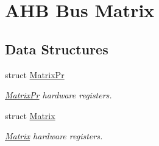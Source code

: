 \hypertarget{group__SAMV71__MATRIX}{}\section{A\+HB Bus Matrix}
\label{group__SAMV71__MATRIX}
\subsection*{Data Structures}
\begin{DoxyCompactItemize}
\item 
struct \mbox{\hyperlink{structMatrixPr}{Matrix\+Pr}}
\begin{DoxyCompactList}\small\item\em \mbox{\hyperlink{structMatrixPr}{Matrix\+Pr}} hardware registers. \end{DoxyCompactList}\item 
struct \mbox{\hyperlink{structMatrix}{Matrix}}
\begin{DoxyCompactList}\small\item\em \mbox{\hyperlink{structMatrix}{Matrix}} hardware registers. \end{DoxyCompactList}\end{DoxyCompactItemize}
